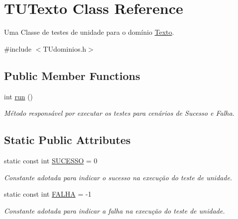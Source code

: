 \hypertarget{classTUTexto}{}\section{T\+U\+Texto Class Reference}
\label{classTUTexto}


Uma Classe de testes de unidade para o domínio \hyperlink{classTexto}{Texto}.  




{\ttfamily \#include $<$T\+Udominios.\+h$>$}

\subsection*{Public Member Functions}
\begin{DoxyCompactItemize}
\item 
int \hyperlink{classTUTexto_afd0ced06861f0e336ef7248f36b31e2c}{run} ()
\begin{DoxyCompactList}\small\item\em Método responsável por executar os testes para cenários de Sucesso e Falha. \end{DoxyCompactList}\end{DoxyCompactItemize}
\subsection*{Static Public Attributes}
\begin{DoxyCompactItemize}
\item 
\mbox{\label{classTUTexto_a85843f1840647cc1c8dc2606fe03dc36}} 
static const int \hyperlink{classTUTexto_a85843f1840647cc1c8dc2606fe03dc36}{S\+U\+C\+E\+S\+SO} = 0
\begin{DoxyCompactList}\small\item\em Constante adotada para indicar o sucesso na execução do teste de unidade. \end{DoxyCompactList}\item 
\mbox{\label{classTUTexto_ad225db82ebc02a313957712dbc70abd2}} 
static const int \hyperlink{classTUTexto_ad225db82ebc02a313957712dbc70abd2}{F\+A\+L\+HA} = -\/1
\begin{DoxyCompactList}\small\item\em Constante adotada para indicar a falha na execução do teste de unidade. \end{DoxyCompactList}\end{DoxyCompactItemize}


